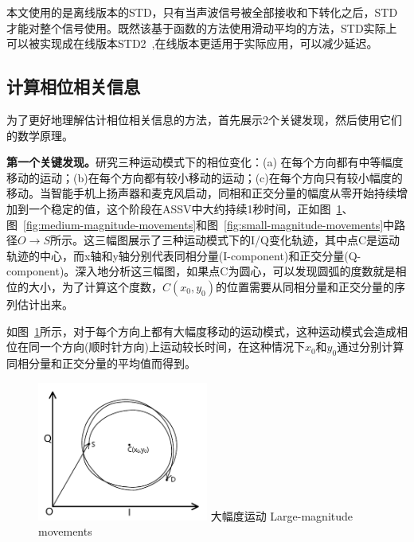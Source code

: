 本文使用的是离线版本的STD，只有当声波信号被全部接收和下转化之后，STD才能对整个信号使用。既然该基于函数的方法使用滑动平均的方法，STD实际上可以被实现成在线版本STD2~\cite{std2},在线版本更适用于实际应用，可以减少延迟。

\subsection{计算相位相关信息}
为了更好地理解估计相位相关信息的方法，首先展示2个关键发现，然后使用它们的数学原理。

\textbf{第一个关键发现。}研究三种运动模式下的相位变化：(a) 在每个方向都有中等幅度移动的运动；(b)在每个方向都有较小移动的运动；(c)在每个方向只有较小幅度的移动。当智能手机上扬声器和麦克风启动，同相和正交分量的幅度从零开始持续增加到一个稳定的值，这个阶段在ASSV中大约持续1秒时间，正如图~\ref{fig:large-magnitude-movements}、图~\ref{fig:medium-magnitude-movements}和图~\ref{fig:small-magnitude-movements}中路径$O\rightarrow S$所示。这三幅图展示了三种运动模式下的I/Q变化轨迹，其中点C是运动轨迹的中心，而x轴和y轴分别代表同相分量(I-component)和正交分量(Q-component)。深入地分析这三幅图，如果点C为圆心，可以发现圆弧的度数就是相位的大小，为了计算这个度数，$C(x_{0},y_{0})$的位置需要从同相分量和正交分量的序列估计出来。

如图~\ref{fig:large-magnitude-movements}所示，对于每个方向上都有大幅度移动的运动模式，这种运动模式会造成相位在同一个方向(顺时针方向)上运动较长时间，在这种情况下$x_0$和$y_0$通过分别计算同相分量和正交分量的平均值而得到。
\begin{figure}[!htp]
  \centering
  \includegraphics[width=0.5\textwidth]{figure/large-magnitude-movement.pdf}
  \bicaption
    {大幅度运动}
    {Large-magnitude movements}
  \label{fig:large-magnitude-movements}
\end{figure}

